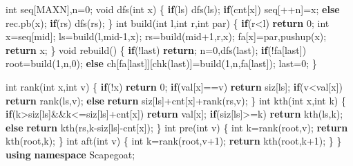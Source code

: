 \documentclass[
]{article}
\newenvironment{Shaded}{}{}
\newcommand{\ControlFlowTok}[1]{\textcolor[rgb]{0.00,0.44,0.13}{\textbf{#1}}}
\newcommand{\DataTypeTok}[1]{\textcolor[rgb]{0.56,0.13,0.00}{#1}}
\newcommand{\DecValTok}[1]{\textcolor[rgb]{0.25,0.63,0.44}{#1}}
\newcommand{\KeywordTok}[1]{\textcolor[rgb]{0.00,0.44,0.13}{\textbf{#1}}}
\newcommand{\NormalTok}[1]{#1}
\begin{document}
\begin{Shaded}
\begin{Highlighting}[]
    \DataTypeTok{int}\NormalTok{ seq[MAXN],n=}\DecValTok{0}\NormalTok{;}
    \DataTypeTok{void}\NormalTok{ dfs(}\DataTypeTok{int}\NormalTok{ x)}
\NormalTok{    \{}
        \ControlFlowTok{if}\NormalTok{(ls) dfs(ls);}
        \ControlFlowTok{if}\NormalTok{(cnt[x]) seq[++n]=x;}
        \ControlFlowTok{else}\NormalTok{ rec.pb(x);}
        \ControlFlowTok{if}\NormalTok{(rs) dfs(rs);}
\NormalTok{    \}}
    \DataTypeTok{int}\NormalTok{ build(}\DataTypeTok{int}\NormalTok{ l,}\DataTypeTok{int}\NormalTok{ r,}\DataTypeTok{int}\NormalTok{ par)}
\NormalTok{    \{}
        \ControlFlowTok{if}\NormalTok{(r\textless{}l) }\ControlFlowTok{return} \DecValTok{0}\NormalTok{;}
        \DataTypeTok{int}\NormalTok{ x=seq[mid];}
\NormalTok{        ls=build(l,mid{-}}\DecValTok{1}\NormalTok{,x);}
\NormalTok{        rs=build(mid+}\DecValTok{1}\NormalTok{,r,x);}
\NormalTok{        fa[x]=par,pushup(x);}
        \ControlFlowTok{return}\NormalTok{ x;}
\NormalTok{    \}}
    \DataTypeTok{void}\NormalTok{ rebuild()}
\NormalTok{    \{}
        \ControlFlowTok{if}\NormalTok{(!last) }\ControlFlowTok{return}\NormalTok{;}
\NormalTok{        n=}\DecValTok{0}\NormalTok{,dfs(last);}
        \ControlFlowTok{if}\NormalTok{(!fa[last]) root=build(}\DecValTok{1}\NormalTok{,n,}\DecValTok{0}\NormalTok{);}
        \ControlFlowTok{else}\NormalTok{ ch[fa[last]][chk(last)]=build(}\DecValTok{1}\NormalTok{,n,fa[last]);}
\NormalTok{        last=}\DecValTok{0}\NormalTok{;}
\NormalTok{    \}}

    \DataTypeTok{int}\NormalTok{ rank(}\DataTypeTok{int}\NormalTok{ x,}\DataTypeTok{int}\NormalTok{ v)}
\NormalTok{    \{}
        \ControlFlowTok{if}\NormalTok{(!x) }\ControlFlowTok{return} \DecValTok{0}\NormalTok{;}
        \ControlFlowTok{if}\NormalTok{(val[x]==v) }\ControlFlowTok{return}\NormalTok{ siz[ls];}
        \ControlFlowTok{if}\NormalTok{(v\textless{}val[x]) }\ControlFlowTok{return}\NormalTok{ rank(ls,v);}
        \ControlFlowTok{else} \ControlFlowTok{return}\NormalTok{ siz[ls]+cnt[x]+rank(rs,v);}
\NormalTok{    \}}
    \DataTypeTok{int}\NormalTok{ kth(}\DataTypeTok{int}\NormalTok{ x,}\DataTypeTok{int}\NormalTok{ k)}
\NormalTok{    \{}
        \ControlFlowTok{if}\NormalTok{(k\textgreater{}siz[ls]\&\&k\textless{}=siz[ls]+cnt[x]) }\ControlFlowTok{return}\NormalTok{ val[x];}
        \ControlFlowTok{if}\NormalTok{(siz[ls]\textgreater{}=k) }\ControlFlowTok{return}\NormalTok{ kth(ls,k);}
        \ControlFlowTok{else} \ControlFlowTok{return}\NormalTok{ kth(rs,k{-}siz[ls]{-}cnt[x]);}
\NormalTok{    \}}
    \DataTypeTok{int}\NormalTok{ pre(}\DataTypeTok{int}\NormalTok{ v)}
\NormalTok{    \{}
        \DataTypeTok{int}\NormalTok{ k=rank(root,v);}
        \ControlFlowTok{return}\NormalTok{ kth(root,k);}
\NormalTok{    \}}
    \DataTypeTok{int}\NormalTok{ aft(}\DataTypeTok{int}\NormalTok{ v)}
\NormalTok{    \{}
        \DataTypeTok{int}\NormalTok{ k=rank(root,v+}\DecValTok{1}\NormalTok{);}
        \ControlFlowTok{return}\NormalTok{ kth(root,k+}\DecValTok{1}\NormalTok{);}
\NormalTok{    \}}
\NormalTok{\}}
\KeywordTok{using} \KeywordTok{namespace}\NormalTok{ Scapegoat;}


\end{Highlighting}
\end{Shaded}
\end{document}
